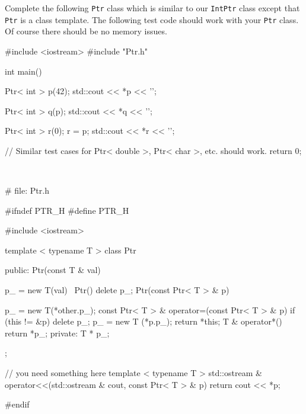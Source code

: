 \nextq
Complete the following \verb!Ptr! class which is similar to our \verb!IntPtr!
class except that \verb!Ptr! is a class template.
The following test code should work with your \verb!Ptr! class.
Of course there should be no memory issues.
\begin{console}[fontsize=\footnotesize]
#include <iostream>
#include "Ptr.h"

int main()
{
    Ptr< int > p(42);
    std::cout << *p << '\n';

    Ptr< int > q(p);
    std::cout << *q << '\n';

    Ptr< int > r(0);
    r = p;
    std::cout << *r << '\n';

    // Similar test cases for Ptr< double >, Ptr< char >, etc. should work.
    return 0;
}
\end{console}
\\
\ANSWER
\begin{answercode}
# file: Ptr.h

#ifndef PTR_H
#define PTR_H

#include <iostream>

template < typename T >
class Ptr
{
public:
    Ptr(const T & val)

    {
      p_ = new T(val)
    }
    ~Ptr()
    {
      delete p_;
    }
    Ptr(const Ptr< T > & p)

    {
      p_ = new T(*other.p_);
    }
    const Ptr< T > & operator=(const Ptr< T > & p)
    {
      if (this != &p)
      {
        delete p_;
        p_ = new T (*p.p_);
      }
      return *this;
    }
    T & operator*()
    {
      return *p_;
    }
private:
    T * p_;
};

// you need something here
template < typename T >
std::ostream & operator<<(std::ostream & cout, const Ptr< T > & p)
{
  return cout << *p;
}

#endif
\end{answercode}


